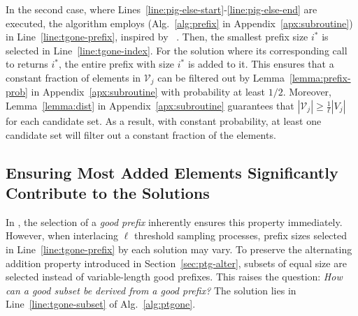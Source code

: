 In the second case, where Lines~\ref{line:pig-else-start}-\ref{line:pig-else-end} are executed,
the algorithm employs \prefix (Alg.~\ref{alg:prefix} in Appendix~\ref{apx:subroutine}) in Line~\ref{line:tgone-prefix},
inspired by \ts~\citep{Chen2024}.
% 
Then, the smallest prefix size $i^*$ is selected in Line~\ref{line:tgone-index}.
For the solution where its corresponding call to \prefix returns $i^*$,
the entire prefix with size $i^*$ is added to it.
This ensures that a constant fraction of elements in $\mathcal V_j$
can be filtered out by Lemma~\ref{lemma:prefix-prob} in Appendix~\ref{apx:subroutine} with probability at least $1/2$.
Moreover, Lemma~\ref{lemma:dist} in Appendix~\ref{apx:subroutine}
guarantees that $|\mathcal V_j| \ge \frac{1}{\ell}|V_j|$
for each candidate set.
As a result, with constant probability,
at least one candidate set will filter out a constant fraction
of the elements.

\subsection{Ensuring Most Added Elements Significantly Contribute to the Solutions}
In \ts, the selection of a \textit{good prefix} inherently ensures this property immediately.
However, when interlacing $\ell$ threshold sampling processes,
prefix sizes selected in Line~\ref{line:tgone-prefix} by each solution may vary.
To preserve the alternating addition property introduced in Section~\ref{sec:ptg-alter},
subsets of equal size are selected instead of variable-length good prefixes.
This raises the question: \textit{How can a good subset be derived from a good prefix?}
The solution lies in Line~\ref{line:tgone-subset} of Alg.~\ref{alg:ptgone}.


